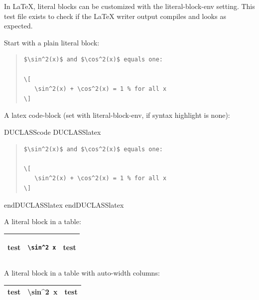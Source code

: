 \documentclass[a4paper]{article}
\newlength{\DUtablewidth} %
\newenvironment{DUclass}[1]%
  {\def\DocutilsClassFunctionName{DUCLASS#1}%
     \csname \DocutilsClassFunctionName \endcsname}%
  {\csname end\DocutilsClassFunctionName \endcsname}%
\newlength{\ttemwidth}
\begin{document}
In LaTeX, literal blocks can be customized with the \textquotedbl{}literal-block-env\textquotedbl{}
setting. This test file exists to check if the LaTeX writer output compiles
and looks as expected.

Start with a plain literal block:

\begin{quote}
\begin{verbatim}
$\sin^2(x)$ and $\cos^2(x)$ equals one:

\[
   \sin^2(x) + \cos^2(x) = 1 % for all x
\]
\end{verbatim}
\end{quote}

A latex \textquotedbl{}code-block\textquotedbl{} (set with \textquotedbl{}literal-block-env\textquotedbl{}, if syntax
highlight is \textquotedbl{}none\textquotedbl{}):

\begin{DUclass}{code}
\begin{DUclass}{latex}
\begin{quote}
\begin{verbatim}
$\sin^2(x)$ and $\cos^2(x)$ equals one:

\[
   \sin^2(x) + \cos^2(x) = 1 % for all x
\]
\end{verbatim}
\end{quote}
\end{DUclass}
\end{DUclass}

A literal block in a table:

\setlength{\DUtablewidth}{\linewidth}
\begin{longtable*}[c]{|p{0.063\DUtablewidth}|p{0.145\DUtablewidth}|p{0.063\DUtablewidth}|}
\hline

test
 & 
\begin{minipage}{8\ttemwidth}
\begin{verbatim}
\sin^2 x
\end{verbatim}
\end{minipage}
 & 
test
 \\
\hline
\end{longtable*}

A literal block in a table with auto-width columns:

\begin{longtable*}[c]{|l|l|l|}
\hline
test & 
\ttfamily\raggedright
\textbackslash{}sin\textasciicircum{}2~x
 & test \\
\hline
\end{longtable*}
\end{document}

